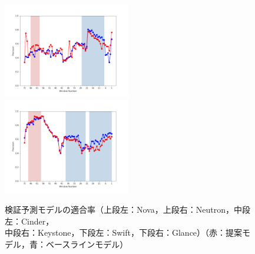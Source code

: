 \documentclass[11pt]{jreport}
\begin{document}
\begin{figure}[H]
\begin{minipage}{\textwidth}
\begin{center}
    \includegraphics[width=0.495\textwidth]{Uenaka_fig/RQ1_result/Swift_review_Precision.pdf}
    \includegraphics[width=0.495\textwidth]{Uenaka_fig/RQ1_result/Glance_review_Precision.pdf}
    \caption{検証予測モデルの適合率（上段左：Nova，上段右：Neutron，中段左：Cinder，\\ 中段右：Keystone，下段左：Swift，下段右：Glance）（赤：提案モデル，青：ベースラインモデル）}
    \label{fig:review_p}
\end{center}
\vspace{0.08\textheight}
\end{minipage}
\end{figure}
\end{document}
